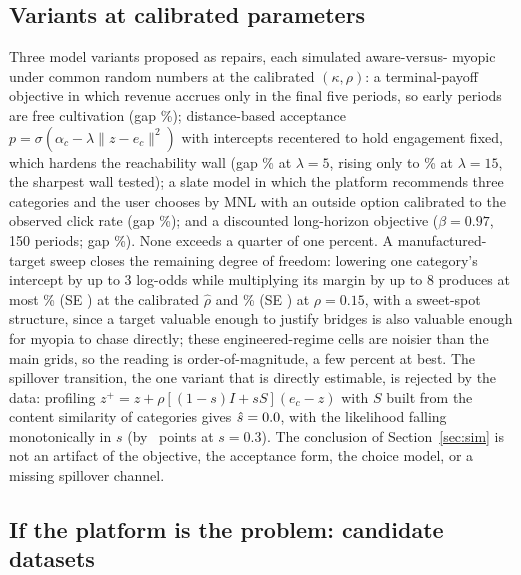 \documentclass[11pt]{article}
\begin{document}
\subsection{Variants at calibrated parameters}

Three model variants proposed as repairs, each simulated aware-versus-
myopic under common random numbers at the calibrated
$(\kappa,\rho)$: a terminal-payoff objective in which revenue accrues
only in the final five periods, so early periods are free cultivation
(gap \vterm\%); distance-based acceptance
$p=\sigma(\alpha_c-\lambda\lVert z-e_c\rVert^2)$ with intercepts
recentered to hold engagement fixed, which hardens the reachability wall
(gap \vdist\% at $\lambda=5$, rising only to \vdistfifteen\% at
$\lambda=15$, the sharpest wall tested); a slate model in which the platform recommends three
categories and the user chooses by MNL with an outside option calibrated
to the observed click rate (gap \vmnl\%); and a discounted long-horizon
objective ($\beta=0.97$, 150 periods; gap \vinf\%). None exceeds a
quarter of one percent. A manufactured-target sweep closes the remaining
degree of freedom: lowering one category's intercept by up to 3 log-odds
while multiplying its margin by up to 8 produces at most
\tgtbesthat\% (SE \tgtbesthatse) at the calibrated $\hat\rho$ and
\tgtbestfast\% (SE \tgtbestfastse) at $\rho=0.15$, with a sweet-spot
structure, since a target valuable enough to justify bridges is also
valuable enough for myopia to chase directly; these engineered-regime
cells are noisier than the main grids, so the reading is
order-of-magnitude, a few percent at best. The spillover transition, the one variant that is directly
estimable, is rejected by the data: profiling
$z^{+}=z+\rho[(1-s)I+sS](e_c-z)$ with $S$ built from the content
similarity of categories gives $\hat s=0.0$, with the likelihood
falling monotonically in $s$ (by \spilldrop\ points at $s=0.3$). The
conclusion of Section~\ref{sec:sim} is not an artifact of the objective,
the acceptance form, the choice model, or a missing spillover channel.


\subsection{If the platform is the problem: candidate datasets}
\end{document}
